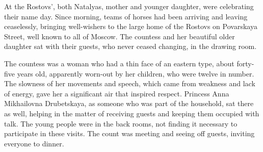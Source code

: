 At the Rostovs', both Natalyas, mother and younger daughter, were celebrating their name day. Since morning, teams of horses had been arriving and leaving ceaselessly, bringing well-wishers to the large home of the Rostovs on Povarskaya Street, well known to all of Moscow. The countess and her beautiful older daughter sat with their guests, who never ceased changing, in the drawing room.

The countess was a woman who had a thin face of an eastern type, about forty-five years old, apparently worn-out by her children, who were twelve in number. The slowness of her movements and speech, which came from weakness and lack of energy, gave her a significant air that inspired respect. Princess Anna Mikhailovna Drubetskaya, as someone who was part of the household, sat there as well, helping in the matter of receiving guests and keeping them occupied with talk. The young people were in the back rooms, not finding it necessary to participate in these visits. The count was meeting and seeing off guests, inviting everyone to dinner.

